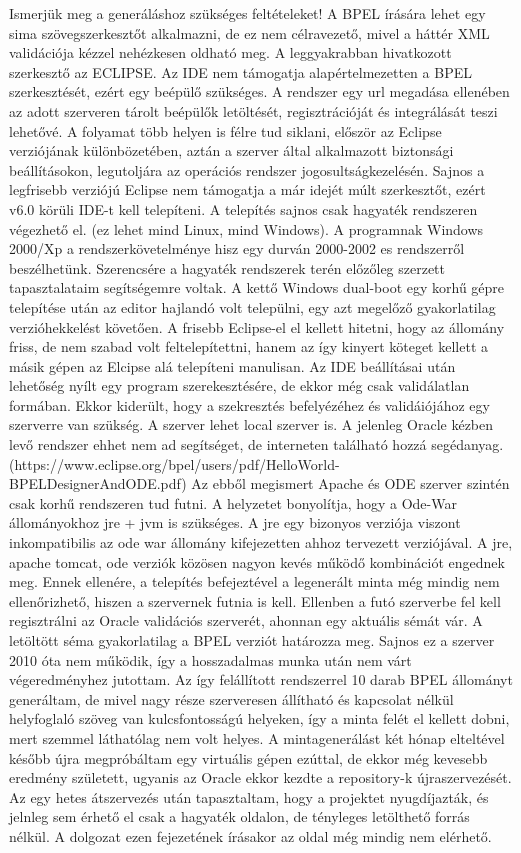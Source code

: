 Ismerjük meg a generáláshoz szükséges feltételeket! A BPEL írására lehet egy sima szövegszerkesztőt alkalmazni, de ez nem célravezető, mivel a háttér XML validációja kézzel nehézkesen oldható meg. A leggyakrabban hivatkozott szerkesztő az ECLIPSE. Az IDE nem támogatja alapértelmezetten a BPEL szerkesztését, ezért egy beépülő szükséges. A rendszer egy url megadása ellenében az adott szerveren tárolt beépülők letöltését, regisztrációját és integrálását teszi lehetővé. A folyamat több helyen is félre tud siklani, először az Eclipse verziójának különbözetében, aztán a szerver által alkalmazott biztonsági beállításokon, legutoljára az operációs rendszer jogosultságkezelésén. Sajnos a legfrisebb verziójú Eclipse nem támogatja a már idejét múlt szerkesztőt, ezért v6.0 körüli IDE-t kell telepíteni. A telepítés sajnos csak hagyaték rendszeren végezhető el. (ez lehet mind Linux, mind Windows). A programnak Windows 2000/Xp a rendszerkövetelménye hisz egy durván 2000-2002 es rendszerről beszélhetünk. Szerencsére a hagyaték rendszerek terén előzőleg szerzett tapasztalataim segítségemre voltak. A kettő Windows dual-boot egy korhű gépre telepítése után az editor hajlandó volt települni, egy azt megelőző gyakorlatilag verzióhekkelést követően. A frisebb Eclipse-el el kellett hitetni, hogy az állomány friss, de nem szabad volt feltelepítettni, hanem az így kinyert köteget kellett a másik gépen az Elcipse alá telepíteni manulisan. Az IDE beállításai után lehetőség nyílt egy program szerekesztésére, de ekkor még csak validálatlan formában. Ekkor kiderült, hogy a szekresztés befelyézéhez és validáiójához egy szerverre van szükség. A szerver lehet local szerver is. A jelenleg Oracle kézben levő rendszer ehhet nem ad segítséget, de interneten található hozzá segédanyag.(https://www.eclipse.org/bpel/users/pdf/HelloWorld-BPELDesignerAndODE.pdf) Az ebből megismert Apache és ODE szerver szintén csak korhű rendszeren tud futni. A helyzetet bonyolítja, hogy a Ode-War állományokhoz jre + jvm is szükséges. A jre egy bizonyos verziója viszont inkompatibilis az ode war állomány kifejezetten ahhoz tervezett verziójával. A jre, apache tomcat, ode verziók közösen nagyon kevés működő kombinációt engednek meg. Ennek ellenére, a telepítés befejeztével a legenerált minta még mindig nem ellenőrizhető, hiszen a szervernek futnia is kell. Ellenben a futó szerverbe fel kell regisztrálni az Oracle validációs szerverét, ahonnan egy aktuális sémát vár. A letöltött séma gyakorlatilag  a BPEL verziót határozza meg. Sajnos ez a szerver 2010 óta nem működik, így a hosszadalmas munka után nem várt végeredményhez jutottam. Az így felállított rendszerrel 10 darab BPEL állományt generáltam, de mivel nagy része szerveresen állítható és kapcsolat nélkül helyfoglaló szöveg van kulcsfontosságú helyeken, így a minta felét el kellett dobni, mert szemmel láthatólag nem volt helyes. A mintagenerálást két hónap elteltével később újra megpróbáltam egy virtuális gépen ezúttal, de ekkor még kevesebb eredmény született, ugyanis az Oracle ekkor kezdte a repository-k újraszervezését. Az egy hetes átszervezés után tapasztaltam, hogy a projektet nyugdíjazták, és jelnleg sem érhető el csak a hagyaték oldalon, de tényleges letölthető forrás nélkül. A dolgozat ezen fejezetének írásakor az oldal még mindig nem elérhető. 

